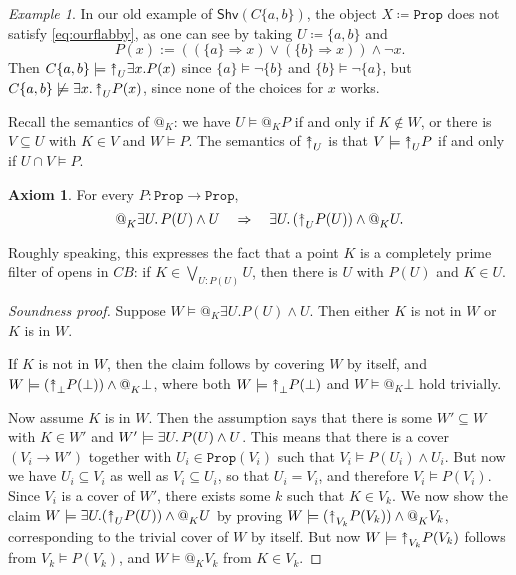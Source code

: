 \documentclass[11pt, oneside, article]{memoir}
\makeatletter
\theoremstyle{plain}
\theoremstyle{definition}
\newtheorem{axiom}{Axiom}
\theoremstyle{remark}
\newtheorem{example}[theorem]{Example}
\newenvironment{soundproof}{\begin{proof}[Soundness proof]}{\end{proof}}
\newcommand{\const}[1]{\mathtt{#1}}
\newcommand{\Fun}[1]{\mathsf{#1}}
\newcommand{\Shv}{\Fun{Shv}}
\newcommand{\Prop}{\const{Prop}}
\newcommand{\BaseSpace}{B}
\newcommand{\AtSymbol}{{@}}
\newcommand{\InSymbol}{{\upclose}}%
\newcommand{\At}[2][]{\AtSymbol^{#1}_{#2}}
\newcommand{\In}[2][]{\InSymbol^{#1}_{#2}}
\newcommand{\upclose}{{\rotatebox[origin=c]{90}{$\twoheadrightarrow$}}}
\newcommand{\imp}{\Rightarrow}
\makeatother
\begin{document}
\begin{example}
In our old example of $\Shv(C\{a,b\})$, the object $X \coloneqq \Prop$ does not satisfy \eqref{eq:ourflabby}, as one can see by taking $U \coloneqq \{a,b\}$ and
\[
	P(x) := ((\{a\}\imp x) \vee (\{b\}\imp x)) \wedge \neg x.
\]
Then $C\{a,b\} \models \In{U} \exists x. P(x)$ since $\{a\} \models \neg \{b\}$ and $\{b\} \models \neg \{a\}$, but $C\{a,b\} \not\models \exists x\ldotp \In{U} P(x)$, since none of the choices for $x$ works.
\end{example}

Recall the semantics of $\At{K}$: we have $U \models \At{K} P$ if and only if $K \not\in W$, or there is $V\subseteq U$ with $K\in V$ and $W \models P$. The semantics of $\In{U}$ is that $V \models \In{U} P$ if and only if $U \cap V \models P$.

\begin{axiom}\label{axiom:completely_prime}
For every $P : \Prop \to \Prop$,
\[
	\At{K} \exists U\ldotp P(U) \wedge U \quad \imp \quad \exists U\ldotp (\In{U} P(U)) \wedge \At{K} U.
\]
\end{axiom}

Roughly speaking, this expresses the fact that a point $K$ is a completely prime filter of opens in $C\BaseSpace$: if $K\in \bigvee_{U : P(U)} U$, then there is $U$ with $P(U)$ and $K\in U$.

\begin{soundproof}
    Suppose $W \models @_K \exists U. P(U) \wedge U$. Then either $K$ is not in $W$ or $K$ is in $W$.

    If $K$ is not in $W$, then the claim follows by covering $W$ by itself, and $W \models (\In{\bot} P(\bot)) \wedge \At{K} \bot$, where both $W \models \In{\bot} P(\bot)$ and $W \models \At{K} \bot$ hold trivially.

    Now assume $K$ is in $W$. Then the assumption says that there is some $W'\subseteq W$ with $K\in W'$ and $W' \models \exists U\ldotp P(U) \wedge U$. This means that there is a cover $(V_i\to W')$ together with $U_i\in\Prop(V_i)$ such that $V_i \models P(U_i) \wedge U_i$. But now we have $U_i \subseteq V_i$ as well as $V_i \subseteq U_i$, so that $U_i = V_i$, and therefore $V_i \models P(V_i)$. Since $V_i$ is a cover of $W'$, there exists some $k$ such that $K \in V_k$. We now show the claim $W \models \exists U. (\In{U} P(U)) \wedge \At{K} U$ by proving $W \models (\In{V_k} P(V_k)) \wedge \At{K} V_k$, corresponding to the trivial cover of $W$ by itself. But now $W \models \In{V_k} P(V_k)$ follows from $V_k \models P(V_k)$, and $W \models \At{K} V_k$ from $K\in V_k$.
\end{soundproof}
\end{document}
